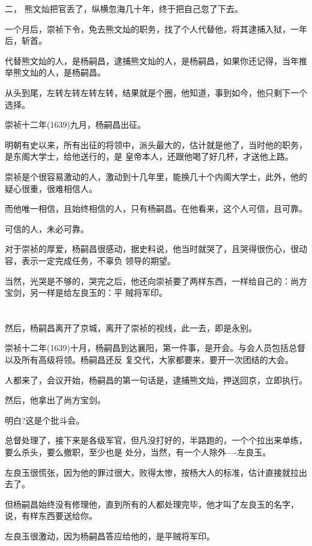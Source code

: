 \documentclass[11pt,a4paper,onecolumn]{article}
\begin{document}
二， 熊文灿把官丢了，纵横忽海几十年，终于把自己忽了下去。

一个月后，崇祯下令，免去熊文灿的职务，找了个人代替他，将其逮捕入狱，一年后，斩首。

代替熊文灿的人，是杨嗣昌，逮捕熊文灿的人，是杨嗣昌，如果你还记得，当年推举熊文灿的人，是杨嗣昌。

从头到尾，左转左转左转左转，结果就是个圈，他知道，事到如今，他只剩下一个选择。

崇祯十二年(1639)九月，杨嗣昌出征。

明朝有史以来，所有出征的将领中，派头最大的，估计就是他了，当时他的职务，是东阁大学士，给他送行的，是
皇帝本人，还跟他喝了好几杯，才送他上路。

崇祯是个很容易激动的人，激动到十几年里，能换几十个内阁大学士，此外，他的疑心很重，很难相信人。

而他唯一相信，且始终相信的人，只有杨嗣昌。在他看来，这个人可信，且可靠。

可信的人，未必可靠。

对于崇祯的厚爱，杨嗣昌很感动，据史料说，他当时就哭了，且哭得很伤心，很动容，表示一定完成任务，不辜负
领导的期望。

当然，光哭是不够的，哭完之后，他还向崇祯要了两样东西，一样给自己的：尚方宝剑，另一样是给左良玉的：平
贼将军印。

\section[\thesection]{}

然后，杨嗣昌离开了京城，离开了崇祯的视线，此一去，即是永别。

崇祯十二年(1639)十月，杨嗣昌到达襄阳，第一件事，是开会。与会人员包括总督以及所有高级将领。杨嗣昌还反
复交代，大家都要来，要开一次团结的大会。

人都来了，会议开始，杨嗣昌的第一句话是，逮捕熊文灿，押送回京，立即执行。

然后，他拿出了尚方宝剑。

明白?这是个批斗会。

总督处理了，接下来是各级军官，但凡没打好的，半路跑的，一个个拉出来单练，要么杀头，要么撤职，至少也是
处分，当然，有一个人除外----左良玉。

左良玉很慌张，因为他的罪过很大，败得太惨，按杨大人的标准，估计直接就拉出去了。

但杨嗣昌始终没有修理他，直到所有的人都处理完毕，他才叫了左良玉的名字，说，有样东西要送给你。

左良玉很激动，因为杨嗣昌答应给他的，是平贼将军印。
\end{document}
